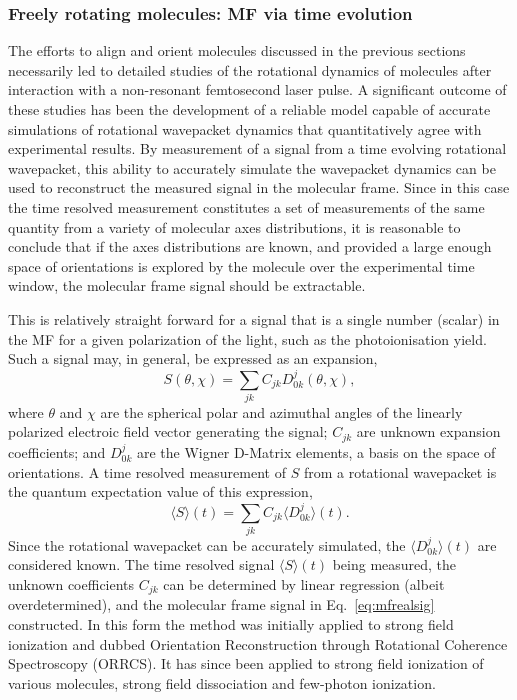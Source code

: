 \subsubsection{Freely rotating molecules: MF via time evolution\label{sec:RWPs}}

The efforts to align and orient molecules discussed in the previous sections necessarily led to detailed studies of the rotational dynamics of molecules after interaction with a non-resonant femtosecond laser pulse. A significant outcome of these studies has been the development of a reliable model capable of accurate simulations of rotational wavepacket dynamics that quantitatively agree with experimental results. By measurement of a signal from a time evolving rotational wavepacket, this ability to accurately simulate the wavepacket dynamics can be used to reconstruct the measured signal in the molecular frame. Since in this case the time resolved measurement constitutes a set of measurements of the same quantity from a variety of molecular axes distributions, it is reasonable to conclude that if the axes distributions are known, and provided a large enough space of orientations is explored by the molecule over the experimental time window, the molecular frame signal should be extractable. 

This is relatively straight forward for a signal that is a single number (scalar) in the MF for a given polarization of the light, such as the photoionisation yield. Such a signal may, in general, be expressed as an expansion,
\begin{equation}
S(\theta,\chi)=\sum_{jk}C_{jk}D^{j}_{0k}(\theta,\chi),
\label{eq:mfrealsig}
\end{equation}
where $\theta$ and $\chi$ are the spherical polar and azimuthal angles of the linearly polarized electroic field vector generating the signal; $C_{jk}$ are unknown expansion coefficients; and $D^{j}_{0k}$ are the Wigner D-Matrix elements, a basis on the space of orientations. A time resolved measurement of $S$ from a rotational wavepacket is the quantum expectation value of this expression,
\begin{equation}
\langle S \rangle(t) = \sum_{jk}C_{jk}\langle D^{j}_{0k} \rangle (t).
\label{eq:St-Cjk}
\end{equation}
Since the rotational wavepacket can be accurately simulated, the $\langle D^{j}_{0k} \rangle (t)$ are considered known. The time resolved signal $\langle S \rangle(t)$ being measured, the unknown coefficients $C_{jk}$ can be determined by linear regression (albeit overdetermined), and the molecular frame signal in Eq.~\ref{eq:mfrealsig} constructed. In this form the method was initially applied to strong field ionization and dubbed Orientation Reconstruction through Rotational Coherence Spectroscopy (ORRCS). It has since been applied to strong field ionization of various molecules, strong field dissociation and few-photon ionization.


